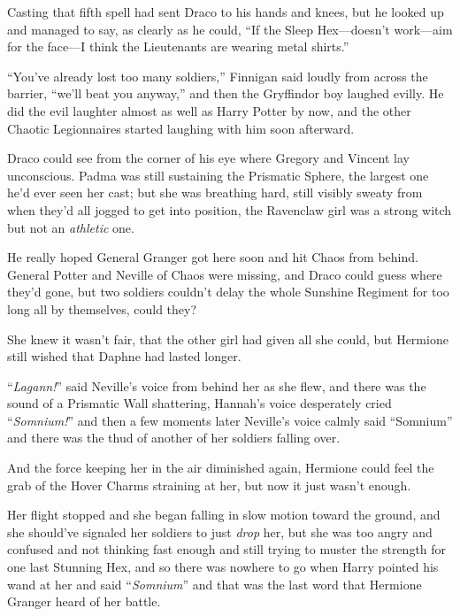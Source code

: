 Casting that fifth spell had sent Draco to his hands and knees, but he looked up and managed to say, as clearly as he could, “If the Sleep Hex—doesn’t work—aim for the face—I think the Lieutenants are wearing metal shirts.”

“You’ve already lost too many soldiers,” Finnigan said loudly from across the barrier, “we’ll beat you anyway,” and then the Gryffindor boy laughed evilly. He did the evil laughter almost as well as Harry Potter by now, and the other Chaotic Legionnaires started laughing with him soon afterward.

Draco could see from the corner of his eye where Gregory and Vincent lay unconscious. Padma was still sustaining the Prismatic Sphere, the largest one he’d ever seen her cast; but she was breathing hard, still visibly sweaty from when they’d all jogged to get into position, the Ravenclaw girl was a strong witch but not an \emph{athletic} one.

He really hoped General Granger got here soon and hit Chaos from behind. General Potter and Neville of Chaos were missing, and Draco could guess where they’d gone, but two soldiers couldn’t delay the whole Sunshine Regiment for too long all by themselves, could they?

\later

She knew it wasn’t fair, that the other girl had given all she could, but Hermione still wished that Daphne had lasted longer.

“\emph{Lagann!}” said Neville’s voice from behind her as she flew, and there was the sound of a Prismatic Wall shattering, Hannah’s voice desperately cried “\emph{Somnium!}” and then a few moments later Neville’s voice calmly said “Somnium” and there was the thud of another of her soldiers falling over.

And the force keeping her in the air diminished again, Hermione could feel the grab of the Hover Charms straining at her, but now it just wasn’t enough.

Her flight stopped and she began falling in slow motion toward the ground, and she should’ve signaled her soldiers to just \emph{drop} her, but she was too angry and confused and not thinking fast enough and still trying to muster the strength for one last Stunning Hex, and so there was nowhere to go when Harry pointed his wand at her and said “\emph{Somnium}” and that was the last word that Hermione Granger heard of her battle.
